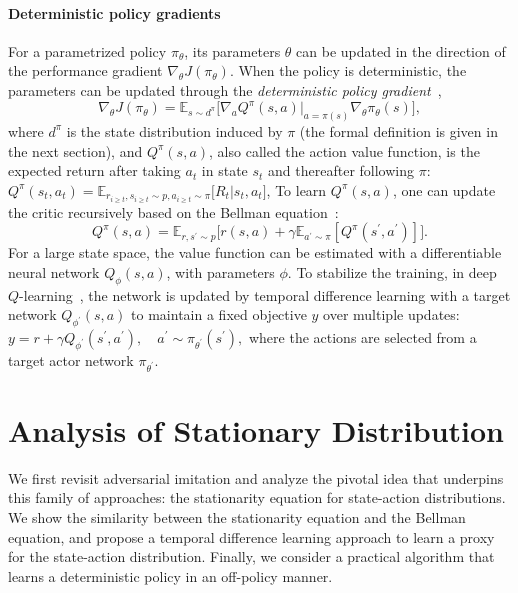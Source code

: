 \documentclass[letterpaper]{article} %
\begin{document}
\paragraph{Deterministic policy gradients}
For a parametrized policy $\pi_{\theta}$, its parameters $\theta$ can be updated in the direction of the performance gradient $\nabla_{\theta}J(\pi_{\theta})$. 
When the policy is deterministic, the parameters can be updated through the \textit{deterministic policy gradient}~\cite{silver2014deterministic},
\begin{equation}\label{equ:deterministic-pg}
\nabla_{\theta}J(\pi_\theta) = \mathbb{E}_{s\sim d^\pi} \big[ \nabla_a Q^\pi(s, a)|_{a=\pi(s)}\nabla_{\theta}\pi_{\theta}(s) \big], 
\end{equation}
where $d^\pi$ is the state distribution induced by $\pi$ (the formal definition is given in the next section), 
and $Q^\pi(s, a)$, also called the action value function, is the expected return after taking $a_t$ in state $s_t$ and thereafter following $\pi$: $Q^{\pi}(s_t, a_t) = \mathbb{E}_{r_{i\geq t}, s_{i\geq t}\sim p, a_{i\geq t}\sim\pi}\big[ R_t| s_t, a_t \big]$, 
To learn $Q^{\pi}(s, a)$, one can update the critic recursively based on the Bellman equation~\cite{sutton2018reinforcement}:
\begin{equation}\label{equ:bellman-equation}
Q^{\pi}(s, a) = \mathbb{E}_{r, s^\prime\sim p}\big[ r(s, a) + \gamma \mathbb{E}_{a^\prime\sim \pi} [Q^\pi(s^\prime, a^\prime)] \big]. 
\end{equation}
For a large state space, the value function can be estimated with a differentiable neural network $Q_{\phi}(s, a)$, with parameters $\phi$. 
To stabilize the training, in deep $Q$-learning~\cite{mnih2015human}, the network is updated by temporal difference learning with a target network $Q_{\phi^\prime}(s, a)$ to maintain a fixed objective $y$ over multiple updates:
$y = r + \gamma Q_{\phi^\prime}(s^\prime, a^\prime), \quad a^\prime\sim\pi_{\theta^\prime}(s^\prime),$
where the actions are selected from a target actor network $\pi_{\theta^\prime}$. 


\section{Analysis of Stationary Distribution}\label{sec:d2-imitation}
We first revisit adversarial imitation 
and analyze the pivotal idea that underpins this family of approaches: the stationarity equation for state-action distributions. 
We show the similarity between the stationarity equation and the Bellman equation, 
and propose a temporal difference learning approach to learn a proxy for the state-action distribution. 
Finally, we consider a practical algorithm that learns a deterministic policy in an off-policy manner. 
\end{document}
